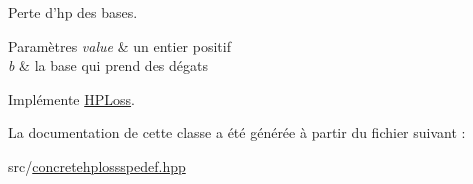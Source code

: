 Perte d'hp des bases. 


\begin{DoxyParams}{Paramètres}
{\em value} & un entier positif \\
\hline
{\em b} & la base qui prend des dégats \\
\hline
\end{DoxyParams}


Implémente \hyperlink{classHPLoss_a65218bfa1695b56033b5ba894ba0d778}{H\+P\+Loss}.



La documentation de cette classe a été générée à partir du fichier suivant \+:\begin{DoxyCompactItemize}
\item 
src/\hyperlink{concretehplossspedef_8hpp}{concretehplossspedef.\+hpp}\end{DoxyCompactItemize}

